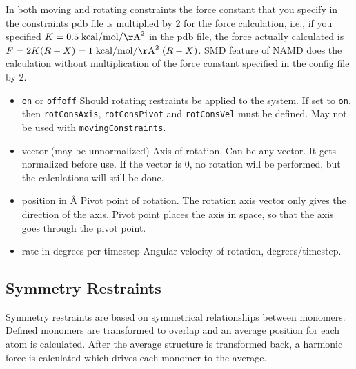 In both moving and rotating constraints the force constant that you
   specify in the constraints pdb file is multiplied by 2 for the force
   calculation, i.e., if you specified $K = 0.5 \; {\rm kcal}/{\rm mol}/{\rm \AA}^2$ in the pdb
file,
   the force actually calculated is $F = 2 K (R-X) = 1 \; {\rm kcal}/{\rm mol}/{\rm \AA}^2 \; (R-X)$.
   SMD feature of NAMD does the calculation without multiplication of
the
   force constant specified in the config file by 2.


\begin{itemize}

\item
{}
{{\tt on} or {\tt off}}{{\tt off}}
{Should rotating restraints be applied to the system. If set
to {\tt on}, then {\tt rotConsAxis}, {\tt rotConsPivot} and
{\tt rotConsVel} must be defined.
May not be used with {\tt movingConstraints}.}

\item
{}
{vector (may be unnormalized)}
{Axis of rotation. Can be any vector. It gets
normalized before use. If the vector is 0,
no rotation will be performed, but the calculations
will still be done.}

\item
{}
{position in \AA}
{Pivot point of rotation. The rotation axis vector
only gives the direction of the axis. Pivot point
places the axis in space, so that the axis goes
through the pivot point.}

\item
{}
{rate in degrees per timestep}
{Angular velocity of rotation, degrees/timestep.}

\end{itemize}

\subsection{Symmetry Restraints}
Symmetry restraints are based on symmetrical relationships
between monomers.  Defined monomers are transformed to overlap
and an average position for each atom is calculated.  After the average 
structure is transformed back, a harmonic force is calculated which 
drives each monomer to the average.

